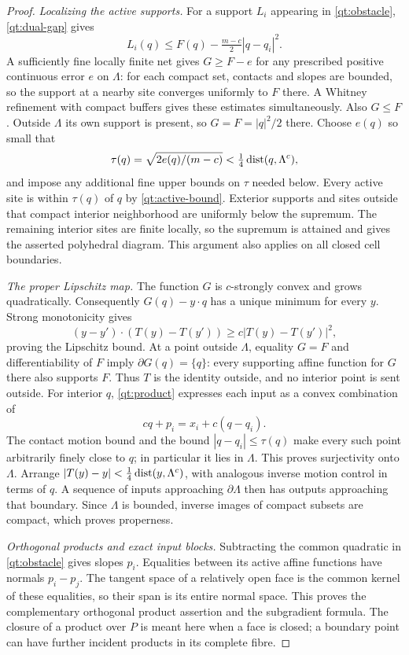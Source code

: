 \begin{proof}
\emph{Localizing the active supports.}
For a support $L_i$ appearing in \eqref{qt:obstacle},
\eqref{qt:dual-gap} gives
\begin{equation}\label{qt:active-bound}
 L_i(q)\leq F(q)-\tfrac{m-c}{2}|q-q_i|^2.
\end{equation}
A sufficiently fine locally finite net gives $G\geq F-e$ for any
prescribed positive continuous error $e$ on $\Lambda$: for each compact
set, contacts and slopes are bounded, so the support at a nearby site
converges uniformly to $F$ there.  A Whitney refinement with compact
buffers gives these estimates simultaneously.  Also $G\leq F$.
Outside $\Lambda$ its own support is present, so $G=F=|q|^2/2$ there.
Choose $e(q)$ so small that
\[
 \tau(q)=\sqrt{2e(q)/(m-c)}<\tfrac14\operatorname{dist}(q,\Lambda^c),
\]
and impose any additional fine upper bounds on $\tau$ needed below.
Every active site is within $\tau(q)$ of $q$ by
\eqref{qt:active-bound}.  Exterior supports and sites outside that
compact interior neighborhood are uniformly below the supremum.
The remaining interior sites are finite locally, so the supremum is
attained and gives the asserted polyhedral diagram.  This argument
also applies on all closed cell boundaries.

\emph{The proper Lipschitz map.}
The function $G$ is $c$-strongly convex and grows quadratically.
Consequently $G(q)-y\cdot q$ has a unique minimum for every $y$.
Strong monotonicity gives
\[
 (y-y')\cdot(T(y)-T(y'))\geq c|T(y)-T(y')|^2,
\]
proving the Lipschitz bound.  At a point outside $\Lambda$, equality
$G=F$ and differentiability of $F$ imply $\partial G(q)=\{q\}$:
every supporting affine function for $G$ there also supports $F$.
Thus $T$ is the identity outside, and no interior point is sent outside.
For interior $q$, \eqref{qt:product} expresses each input as a convex
combination of
\[
 cq+p_i=x_i+c(q-q_i).
\]
The contact motion bound and the bound $|q-q_i|\leq\tau(q)$ make every
such point arbitrarily finely close to $q$; in particular it lies in
$\Lambda$.  This proves surjectivity onto $\Lambda$.  Arrange
$|T(y)-y|<\tfrac14\operatorname{dist}(y,\Lambda^c)$, with analogous inverse motion
control in terms of $q$.  A sequence of inputs approaching
$\partial\Lambda$ then has outputs approaching that boundary.  Since
$\Lambda$ is bounded, inverse images of compact subsets are compact,
which proves properness.

\emph{Orthogonal products and exact input blocks.}
Subtracting the common quadratic in \eqref{qt:obstacle} gives slopes
$p_i$.  Equalities between its active affine functions have normals
$p_i-p_j$.  The tangent space of a relatively open face is the common
kernel of these equalities, so their span is its entire normal space.
This proves the complementary orthogonal product assertion and the
subgradient formula.  The closure of a product over $P$ is meant here
when a face is closed; a boundary point can have further incident
products in its complete fibre.


\end{proof}

